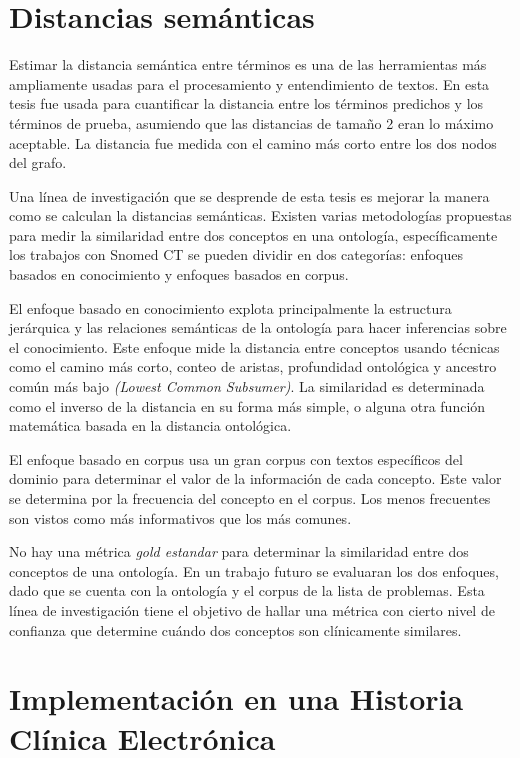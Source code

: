 \section{Distancias semánticas}

Estimar la distancia semántica entre términos es una de las herramientas más ampliamente usadas para el procesamiento y entendimiento de textos. En esta tesis fue usada para cuantificar la distancia entre los términos predichos y los términos de prueba, asumiendo que las distancias de tamaño 2 eran lo máximo aceptable. La distancia fue medida con el camino más corto entre los dos nodos del grafo.

Una línea de investigación que se desprende de esta tesis es mejorar la manera como se calculan la distancias semánticas. Existen varias metodologías propuestas para medir la similaridad entre dos conceptos en una ontología, específicamente los trabajos con Snomed CT se pueden dividir en dos categorías: enfoques basados en conocimiento y enfoques basados en corpus.  \cite{Mabotuwana2013,BenAouicha2016,Sanchez2011,Harispe2014}

El enfoque basado en conocimiento explota principalmente la estructura jerárquica y las relaciones semánticas de la ontología para hacer inferencias sobre el conocimiento. Este enfoque mide la distancia entre conceptos usando técnicas como el camino más corto, conteo de aristas, profundidad ontológica y ancestro común más bajo \textit{(Lowest Common Subsumer)}. La similaridad es determinada como el inverso de la distancia en su forma más simple, o alguna otra función matemática basada en la distancia ontológica.\cite{Mabotuwana2013}

El enfoque basado en corpus usa un gran corpus con textos específicos del dominio para determinar el valor de la información de cada concepto. Este valor se determina por la frecuencia del concepto en el corpus. Los menos frecuentes son vistos como más informativos que los más comunes.\cite{Mabotuwana2013}

No hay una métrica \textit{gold estandar} para determinar la similaridad entre dos conceptos de una ontología. En un trabajo futuro se evaluaran los dos enfoques, dado que se cuenta con la ontología y el corpus de la lista de problemas. Esta línea de investigación tiene  el objetivo de hallar una métrica con cierto nivel de confianza que determine cuándo dos conceptos son clínicamente similares.

\section{Implementación en una Historia Clínica Electrónica}

